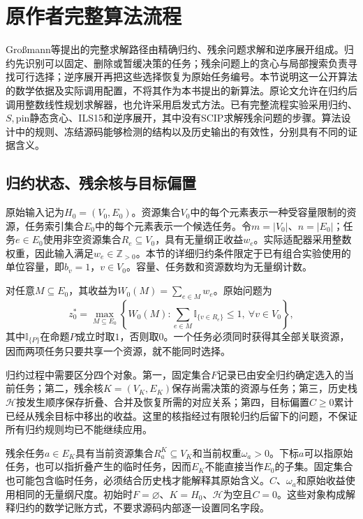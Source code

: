 \section{原作者完整算法流程}
\label{sec:03_04}

Großmann等提出的完整求解路径由精确归约、残余问题求解和逆序展开组成\cite{GrossmannJRS2026}。归约先识别可以固定、删除或暂缓决策的任务；残余问题上的贪心与局部搜索负责寻找可行选择；逆序展开再把这些选择恢复为原始任务编号。本节说明这一公开算法的数学依据及实际调用配置，不将其作为本书提出的新算法。原论文允许在归约后调用整数线性规划求解器，也允许采用启发式方法。已有完整流程实验采用归约、$S,\mathrm{pin}$静态贪心、ILS15和逆序展开，其中没有SCIP求解残余问题的步骤。算法设计中的规则、冻结源码能够检测的结构以及历史输出的有效性，分别具有不同的证据含义。

\subsection{归约状态、残余核与目标偏置}

原始输入记为$H_0=(V_0,E_0)$。资源集合$V_0$中的每个元素表示一种受容量限制的资源，任务索引集合$E_0$中的每个元素表示一个候选任务。令$m=|V_0|$、$n=|E_0|$；任务$e\in E_0$使用非空资源集合$R_e\subseteq V_0$，具有无量纲正收益$w_e$。实际适配器采用整数权重，因此输入满足$w_e\in\mathbb{Z}_{>0}$。本节的详细归约条件限定于已有组合实验使用的单位容量，即$b_v=1$，$v\in V_0$。容量、任务数和资源数均为无量纲计数。

对任意$M\subseteq E_0$，其收益为$W_0(M)=\sum_{e\in M}w_e$。原始问题为
\begin{equation}
 z_0^*=\max_{M\subseteq E_0}
 \left\{W_0(M):
 \sum_{e\in M}\mathbb{I}_{\{v\in R_e\}}\leq1,
 \ \forall v\in V_0\right\},
 \label{s0304:original_problem}
\end{equation}
其中$\mathbb{I}_{\{P\}}$在命题$P$成立时取$1$，否则取$0$。一个任务必须同时获得其全部关联资源，因而两项任务只要共享一个资源，就不能同时选择。

归约过程中需要区分四个对象。第一，固定集合$F$记录已由安全归约确定选入的当前任务；第二，残余核$K=(V_K,E_K)$保存尚需决策的资源与任务；第三，历史栈$\mathcal{H}$按发生顺序保存折叠、合并及恢复所需的对应关系；第四，目标偏置$C\geq0$累计已经从残余目标中移出的收益。这里的核指经过有限轮归约后留下的问题，不保证所有归约规则均已不能继续应用。

残余任务$a\in E_K$具有当前资源集合$R_a^K\subseteq V_K$和当前权重$\omega_a>0$。下标$a$可以指原始任务，也可以指折叠产生的临时任务，因而$E_K$不能直接当作$E_0$的子集。固定集合也可能包含临时任务，必须结合历史栈才能解释其原始含义。$C$、$\omega_a$和原始收益使用相同的无量纲尺度。初始时$F=\varnothing$、$K=H_0$、$\mathcal{H}$为空且$C=0$。这些对象构成解释归约的数学记账方式，不要求源码内部逐一设置同名字段。

